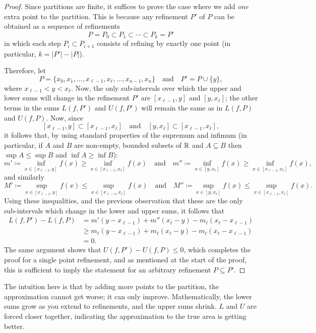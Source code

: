 \documentclass[../analysis1.tex]{subfiles}
\begin{document}
\begin{proof}
    Since partitions are finite, it suffices to prove the case where we add \textit{one} extra point to the partition. This is because any refinement $P'$ of $P$ can be obtained as a sequence of refinements
    \[P= P_0\subset P_1\subset\cdots\subset P_k = P'\]in which each step $P_i\subset P_{i+1}$ consists of refining by exactly one point (in particular, $k=|P'|-|P|$).

    Therefore, let \[P=\{x_0,x_1,\dots,x_{\ell-1},x_\ell,\dots,x_{n-1},x_n\}\quad\text{and}\quad P'=P\cup \{y\},\]
    where $x_{\ell - 1}<y<x_\ell$. Now, the only sub-intervals over which the upper and lower sums will change in the refinement $P'$ are $[x_{\ell -1},y]$ and $[y,x_\ell]$; the other terms in the sums $L(f,P')$ and $U(f,P')$ will remain the same as in $L(f,P)$ and $U(f,P)$. Now, since \[[x_{\ell -1},y]\subset [x_{\ell-1},x_\ell]\quad\text{and}\quad [y,x_\ell]\subset[x_{\ell - 1},x_\ell],\]
    it follows that, by using standard properties of the supremum and infimum (in particular, if $A$ and $B$ are non-empty, bounded subsets of $\mathbb{R}$ and $A\subseteq B$ then $\sup A \le \sup B$ and $\inf A \ge \inf B$):
    \[m'\coloneqq \inf_{x\in [x_{\ell-1},y]}f(x)\ge \inf_{x\in [x_{\ell-1},x_\ell]}f(x)\quad\text{and}\quad m''\coloneqq \inf_{x\in[y,x_\ell]}f(x)\ge \inf_{x\in [x_{\ell-1},x_\ell]}f(x),\]
    and similarly
    \[M'\coloneqq \sup_{x\in [x_{\ell-1},y]}f(x)\le \sup_{x\in [x_{\ell-1},x_\ell]}f(x)\quad\text{and}\quad M''\coloneqq \sup_{x\in[y,x_\ell]}f(x)\le \sup_{x\in [x_{\ell-1},x_\ell]}f(x).\]
    Using these inequalities, and the previous observation that these are the only sub-intervals which change in the lower and upper sums, it follows that
    \begin{align*}
        L(f,P')-L(f,P)&=m'(y-x_{\ell-1})+m''(x_\ell - y)-m_\ell (x_\ell - x_{\ell - 1})\\
            &\ge m_\ell(y-x_{\ell - 1})+m_\ell (x_\ell - y)-m_\ell (x_\ell - x_{\ell - 1})\\
            &= 0.
    \end{align*}
    The same argument shows that $U(f,P')-U(f,P)\le 0$, which completes the proof for a single point refinement, and as mentioned at the start of the proof, this is sufficient to imply the statement for an arbitrary refinement $P\subseteq P'$.\qedhere  
\end{proof}

\begin{remark}
    The intuition here is that by adding more points to the partition, the approximation cannot get worse; it can only improve. Mathematically, the lower sums grow as you extend to refinements, and the upper sums shrink. $L$ and $U$ are forced closer together, indicating the approximation to the true area is getting better.
\end{remark}
\end{document}
